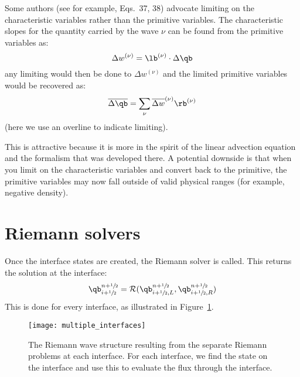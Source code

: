 Some authors (see for example, \cite{athena} Eqs.~37, 38) advocate
limiting on the characteristic variables rather than the primitive
variables.  The characteristic slopes for the quantity carried by the
wave $\nu$ can be found from the primitive variables
as:
%
\begin{equation}
\Delta w^{(\nu)} = \lb^{(\nu)} \cdot \Delta \qb
\end{equation}
%
any limiting would then be done to $\Delta w^{(\nu)}$ and the limited
primitive variables would be recovered as:
\begin{equation}
  \overline{\Delta \qb} = \sum_\nu \overline{\Delta w}^{(\nu)}
  \rb^{(\nu)}
\end{equation}
(here we use an overline to indicate limiting).

This is attractive because it is more in the spirit of the linear
advection equation and the formalism that was developed there.  A
potential downside is that when you limit on the characteristic
variables and convert back to the primitive, the primitive variables
may now fall outside of valid physical ranges (for example, negative
density).



\section{Riemann solvers}


Once the interface states are created, the Riemann solver is called.  This
returns the solution at the interface:
\begin{equation}
\qb_{i+\myhalf}^{n+\myhalf} = \mathcal{R}(\qb_{i+\myhalf,L}^{n+\myhalf}, \qb_{i+\myhalf,R}^{n+\myhalf})
\end{equation}
This is done for every interface, as illustrated in Figure~\ref{fig:euler:multiple_interfaces}.

\begin{figure}
\centering
\texttt{[image: multiple\_interfaces]}
\caption[Riemann wave structure at each interface]{\label{fig:euler:multiple_interfaces}
  The Riemann wave structure resulting from the separate Riemann problems at each interface.  For each
  interface, we find the state on the interface and use this to evaluate the flux through the interface.}
\end{figure}

